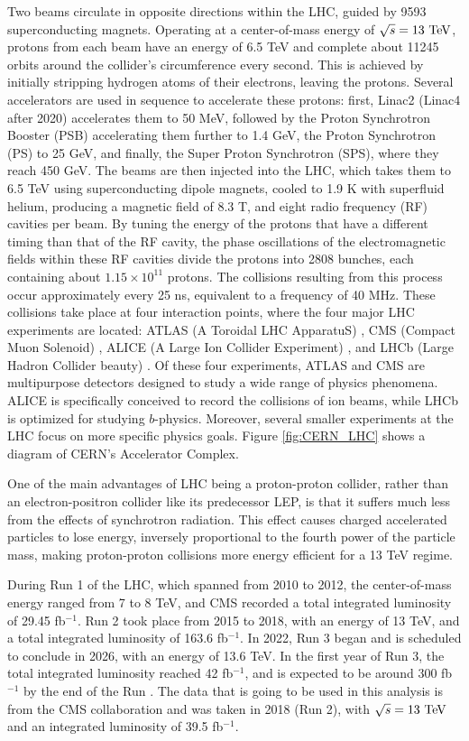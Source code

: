 Two beams circulate in opposite directions within the LHC, guided by 9593 superconducting magnets. Operating at a center-of-mass energy of $\sqrt{s} = 13\ \text{TeV}$, protons from each beam have an energy of 6.5 TeV and complete about 11245 orbits around the collider's circumference every second. This is achieved by initially stripping hydrogen atoms of their electrons, leaving the protons. Several accelerators are used in sequence to accelerate these protons: first, Linac2 (Linac4 after 2020) accelerates them to 50 MeV, followed by the Proton Synchrotron Booster (PSB) accelerating them further to 1.4 GeV, the Proton Synchrotron (PS) to 25 GeV, and finally, the Super Proton Synchrotron (SPS), where they reach 450 GeV. The beams are then injected into the LHC, which takes them to 6.5 TeV using superconducting dipole magnets, cooled to 1.9 K with superfluid helium, producing a magnetic field of 8.3 T, and eight radio frequency (RF) cavities per beam. By tuning the energy of the protons that have a different timing than that of the RF cavity, the phase oscillations of the electromagnetic fields within these RF cavities divide the protons into 2808 bunches, each containing about $1.15\times10^{11}$ protons. The collisions resulting from this process occur approximately every 25 ns, equivalent to a frequency of 40 MHz. These collisions take place at four interaction points, where the four major LHC experiments are located: ATLAS (A Toroidal LHC ApparatuS) \cite{ATLAS:1994vge}, CMS (Compact Muon Solenoid) \cite{CMS:1994hea}, ALICE (A Large Ion Collider Experiment) \cite{413235}, and LHCb (Large Hadron Collider beauty) \cite{LHCb:1998kcv}. Of these four experiments, ATLAS and CMS are multipurpose detectors designed to study a wide range of physics phenomena. ALICE is specifically conceived to record the collisions of ion beams, while LHCb is optimized for studying $b$-physics. Moreover, several smaller experiments at the LHC focus on more specific physics goals. Figure \ref{fig:CERN_LHC} shows a diagram of CERN's Accelerator Complex.

One of the main advantages of LHC being a proton-proton collider, rather than an electron-positron collider like its predecessor LEP, is that it suffers much less from the effects of synchrotron radiation. This effect causes charged accelerated particles to lose energy, inversely proportional to the fourth power of the particle mass, making proton-proton collisions more energy efficient for a 13 TeV regime.

During Run 1 of the LHC, which spanned from 2010 to 2012, the center-of-mass energy ranged from 7 to 8 TeV, and CMS recorded a total integrated luminosity of 29.45 fb$^{-1}$. Run 2 took place from 2015 to 2018, with an energy of 13 TeV, and a total integrated luminosity of 163.6 fb$^{-1}$. In 2022, Run 3 began and is scheduled to conclude in 2026, with an energy of 13.6 TeV. In the first year of Run 3, the total integrated luminosity reached 42 fb$^{-1}$, and is expected to be around 300 fb$^{-1}$ by the end of the Run \cite{CMS:luminosity}. The data that is going to be used in this analysis is from the CMS collaboration and was taken in 2018 (Run 2), with $\sqrt{s} = 13\ \text{TeV}$ and an integrated luminosity of 39.5 fb$^{-1}$.

